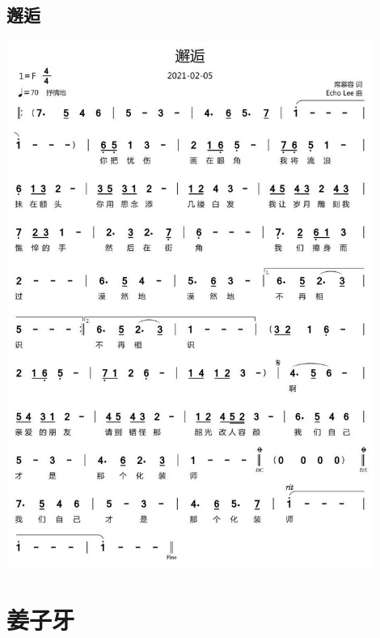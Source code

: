 \documentclass[cn,pad,twocol]{elegantbook}
\begin{document}
\section{邂逅} \includegraphics[width=0.9\textwidth]{macos/20210208邂逅.jpg}

\chapter{姜子牙}
\end{document}
